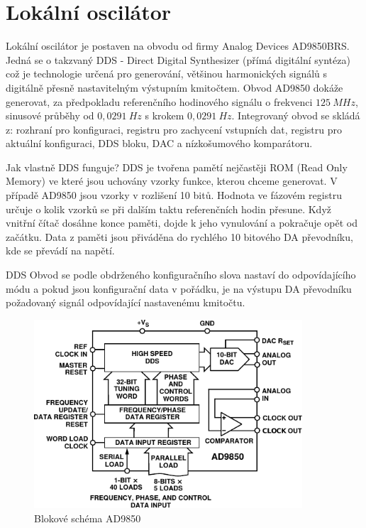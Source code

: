 \clearpage
\section{Lokální oscilátor}
\indent\indent Lokální oscilátor je postaven na obvodu od firmy Analog Devices AD9850BRS. Jedná se o takzvaný DDS - Direct Digital Synthesizer (přímá digitální syntéza) což je technologie určená pro generování, většinou harmonických signálů s digitálně přesně nastavitelným výstupním kmitočtem. Obvod AD9850 dokáže generovat, za předpokladu referenčního hodinového signálu o frekvenci $125~MHz$, sinusové průběhy od $0,0291~Hz$ s krokem $0,0291~Hz$. Integrovaný obvod se skládá z: rozhraní pro konfiguraci, registru pro zachycení vstupních dat, registru pro aktuální konfiguraci, DDS bloku, DAC a nízkošumového komparátoru.

Jak vlastně DDS funguje? DDS je tvořena pamětí nejčastěji ROM (Read Only Memory) ve které jsou uchovány vzorky funkce, kterou chceme generovat. V případě AD9850 jsou vzorky v rozlišení 10 bitů. Hodnota ve fázovém registru určuje o kolik vzorků se při dalším taktu referenčních hodin přesune. Když vnitřní čítač dosáhne konce paměti, dojde k jeho vynulování a pokračuje opět od začátku. Data z paměti jsou přiváděna  do rychlého 10 bitového DA převodníku, kde se převádí na napětí.  			
  			
DDS Obvod se podle obdrženého konfiguračního slova nastaví do odpovídajícího módu a pokud jsou konfigurační data v pořádku, je na výstupu DA převodníku požadovaný signál odpovídající nastavenému kmitočtu.

\vspace{2cm}
\begin{figure}[H]
	\centering
	\includegraphics[width=10cm]{img/lo/AD9850_bd.pdf}
	\caption{Blokové schéma AD9850}    		
\end{figure}


